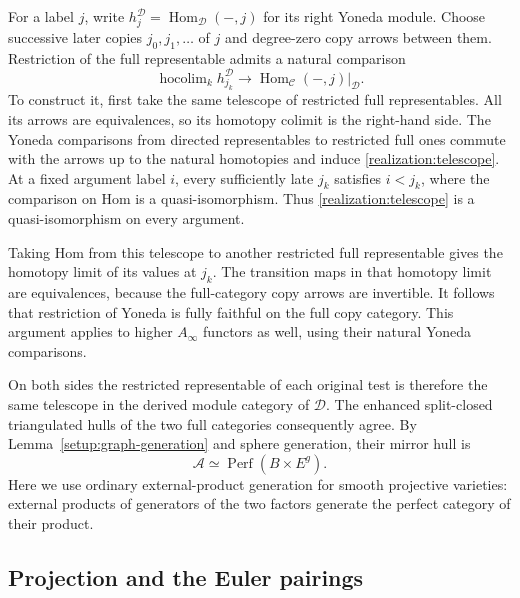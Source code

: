 \documentclass[11pt]{article}
\numberwithin{equation}{section}
\theoremstyle{definition}
\theoremstyle{remark}
\begin{document}
For a label $j$, write $h_j^{\mathcal D}=\operatorname{Hom}_{\mathcal D}(-,j)$ for its
right Yoneda module.  Choose successive later copies
$j_0,j_1,\ldots$ of $j$ and degree-zero copy arrows between them.
Restriction of the full representable admits a natural comparison
\begin{equation}
 \mathop{\operatorname{hocolim}}_k h_{j_k}^{\mathcal D}
 \longrightarrow
 \operatorname{Hom}_{\mathcal C}(-,j)|_{\mathcal D}.
 \label{realization:telescope}
\end{equation}
To construct it, first take the same telescope of restricted full
representables.  All its arrows are equivalences, so its homotopy
colimit is the right-hand side.  The Yoneda comparisons from directed
representables to restricted full ones commute with the arrows up to
the natural homotopies and induce \eqref{realization:telescope}.
At a fixed argument label $i$, every sufficiently late $j_k$ satisfies
$i<j_k$, where the comparison on Hom is a quasi-isomorphism.
Thus \eqref{realization:telescope} is a quasi-isomorphism on every
argument.

Taking Hom from this telescope to another restricted full
representable gives the homotopy limit of its values at $j_k$.
The transition maps in that homotopy limit are equivalences, because
the full-category copy arrows are invertible.  It follows that
restriction of Yoneda is fully faithful on the full copy category.
This argument applies to higher $A_\infty$ functors as well, using
their natural Yoneda comparisons.

On both sides the restricted representable of each original test is
therefore the same telescope in the derived module category of
$\mathcal D$.  The enhanced split-closed triangulated hulls of the two
full categories consequently agree.  By
Lemma~\ref{setup:graph-generation} and sphere generation, their mirror
hull is
\begin{equation}
 \mathcal A\simeq\operatorname{Perf}(B\times E^g).
 \label{realization:mirror-hull}
\end{equation}
Here we use ordinary external-product generation for smooth projective
varieties: external products of generators of the two factors generate
the perfect category of their product.

\subsection{Projection and the Euler pairings}
\end{document}

